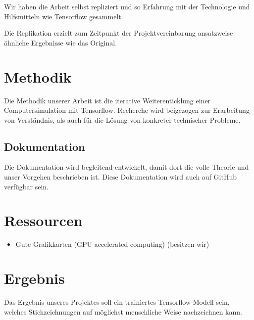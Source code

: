 \documentclass{article}
\begin{document}
Wir haben die Arbeit selbst repliziert und so Erfahrung mit der Technologie und
Hilfsmitteln wie Tensorflow gesammelt.

Die Replikation erzielt zum Zeitpunkt der Projektvereinbarung ansatzweise
ähnliche Ergebnisse wie das Original.


\section{Methodik}
\label{chap:methode}


Die Methodik unserer Arbeit ist die iterative Weiterenticklung einer
Computersimulation mit Tensorflow. Recherche wird beigezogen zur Erarbeitung von
Verständnis, als auch für die Lösung von konkreter technischer Probleme.


\subsection{Dokumentation}
\label{chap:m_dokumentation}
Die Dokumentation wird begleitend entwickelt, damit dort die volle Theorie
und unser Vorgehen beschrieben ist. Diese Dokumentation wird auch auf GitHub
verfügbar sein. 


\section{Ressourcen}
\label{chap:ressourcen}

\begin{itemize}
    \item Gute Grafikkarten (GPU accelerated computing) (besitzen wir)
\end{itemize}


\section{Ergebnis}
\label{chap:ergebnis}
Das Ergebnis unseres Projektes soll ein trainiertes Tensorflow-Modell sein,
welches Stichzeichnungen auf möglichst menschliche Weise nachzeichnen kann.
\end{document}
